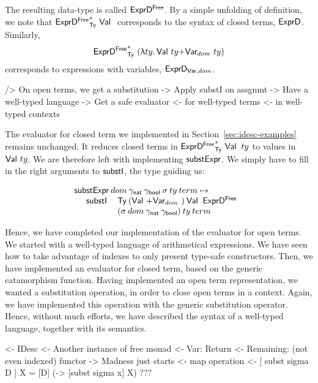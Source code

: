 The resulting data-type is called $\HExprFreeD$. By a simple unfolding
of definition, we note that $\FreeIMonad{\HExprFreeD}{\Ty}{\Val{}}$
corresponds to the syntax of closed terms, $\HExprD$. Similarly,
$$\FreeIMonad{\HExprFreeD}{\Ty}{(\LAM{ty} \SUM{\Val{ty}}{\Var{dom}{ty}})}$$
corresponds to expressions with variables, $\HExprVarD{dom}$.

\begin{wstructure}
    /> On open terms, we get a substitution
        -> Apply substI on assgnmt
            -> Have a well-typed language
            -> Get a safe evaluator 
                <- for well-typed terms 
                <- in well-typed contexts
\end{wstructure}

The evaluator for closed term we implemented in
Section~\ref{sec:idesc-examples} remains unchanged. It reduces closed
terms in $\FreeIMonad{\HExprFreeD}{\Ty}{\Val{}}\: ty$ to values in
$\Val{ty}$. We are therefore left with implementing $\substH$. We
simply have to fill in the right arguments to $\substI$, the type
guiding us:


\[\stk{
\substH\: dom\:
          \gammaNat\: \gammaBool\:
          \sigma\: 
          ty\: 
          term \mapsto  \\
\;\;\ \begin{array}{ll}
       \substI\: & \Ty\: 
                  (\SUM{\Val{}}{\Var{dom}{}})\: 
                  \Val{}\:
                  \HExprFreeD\:  \\
                &
                  (\sigma\: dom\: \gammaNat\: \gammaBool)\:
                  ty\:
                  term
      \end{array}
}\]

Hence, we have completed our implementation of the evaluator for open
terms. We started with a well-typed language of arithmetical
expressions. We have seen how to take advantage of indexes to only
present type-safe constructors. Then, we have implemented an evaluator
for closed term, based on the generic catamorphism function. Having
implemented an open term representation, we wanted a substitution
operation, in order to close open terms in a context. Again, we have
implemented this operation with the generic substitution
operator. Hence, without much efforts, we have described the syntax of
a well-typed language, together with its semantics.

\begin{wstructure}
<- IDesc
    <- Another instance of free monad
        <- Var: Return
        <- Remaining: (not even indexed) functor
    -> Madness just starts
        <- map operation
        <- [ subst sigma D ] X = [D] (\x -> [subst sigma x] X)
        ???
\end{wstructure}


